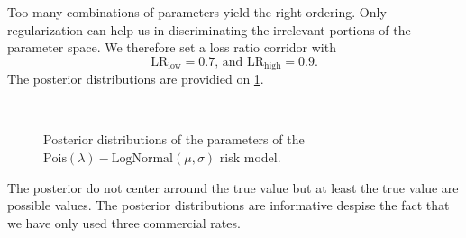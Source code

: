 \documentclass[10pt]{article}
\begin{document}
Too many combinations of parameters yield the right ordering. Only regularization can help us in discriminating the irrelevant portions of the parameter space. We therefore set a loss ratio corridor with 
$$
\text{LR}_{\text{low}} = 0.7\text{, and }\text{LR}_{\text{high}} = 0.9. 
$$
The posterior distributions are providied on \cref{fig:posterior_commercial_premium_w_reg}. 
\begin{figure}[!ht]
  \begin{center}
    \\
    \caption{Posterior distributions of the parameters of the $\text{Pois}(\lambda)-\text{LogNormal}(\mu , \sigma)$ risk model.}
    \label{fig:posterior_commercial_premium_w_reg}
  \end{center}
\end{figure}
The posterior do not center arround the true value but at least the true value are possible values. The posterior distributions are informative despise the fact that we have only used three commercial rates. 
\end{document}
